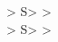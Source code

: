 \documentclass{article}
\begin{document}
\begin{beltgrid}[blueprint]
> S> > \\
> S> >
\end{beltgrid}
\end{document}

